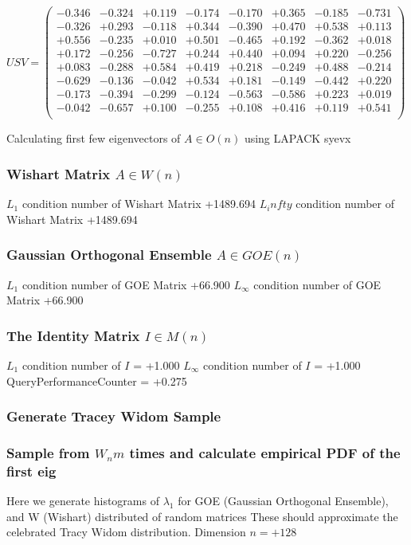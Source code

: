 \documentclass[9pt]{article}
\theoremstyle{plain}
\theoremstyle{definition}
\theoremstyle{remark}
\numberwithin{equation}{section}
\begin{document}
$U S V = \left(
\begin{array}{
cccccccc}
-0.346 & -0.324 & +0.119 & -0.174 & -0.170 & +0.365 & -0.185 & -0.731 \\
-0.326 & +0.293 & -0.118 & +0.344 & -0.390 & +0.470 & +0.538 & +0.113 \\
+0.556 & -0.235 & +0.010 & +0.501 & -0.465 & +0.192 & -0.362 & +0.018 \\
+0.172 & -0.256 & -0.727 & +0.244 & +0.440 & +0.094 & +0.220 & -0.256 \\
+0.083 & -0.288 & +0.584 & +0.419 & +0.218 & -0.249 & +0.488 & -0.214 \\
-0.629 & -0.136 & -0.042 & +0.534 & +0.181 & -0.149 & -0.442 & +0.220 \\
-0.173 & -0.394 & -0.299 & -0.124 & -0.563 & -0.586 & +0.223 & +0.019 \\
-0.042 & -0.657 & +0.100 & -0.255 & +0.108 & +0.416 & +0.119 & +0.541 \\
\end{array}
\right)$ \newline 

Calculating first few eigenvectors of $A \in O(n)$ using LAPACK syevx

\subsubsection{Wishart Matrix $A \in W(n)$}
$L_1$ condition number of Wishart Matrix +1489.694
$L_infty$ condition number of Wishart Matrix +1489.694
\subsubsection{Gaussian Orthogonal Ensemble $A \in GOE(n)$}
$L_1$ condition number of GOE Matrix +66.900
$L_\infty$ condition number of GOE Matrix +66.900
\subsubsection{The Identity Matrix $I \in M(n)$}
$L_1$ condition number of $I$ = +1.000
$L_\infty$ condition number of $I$ = +1.000
QueryPerformanceCounter  =  +0.275
\subsubsection{Generate Tracey Widom Sample}
\subsubsection{Sample from $W_n m$ times and calculate empirical PDF of the first eig}
Here we generate histograms of $\lambda_1$ for GOE (Gaussian Orthogonal Ensemble), and W (Wishart) 		 distributed of random matrices
These should approximate the celebrated Tracy Widom distribution.
Dimension $n = +128$
\end{document}

